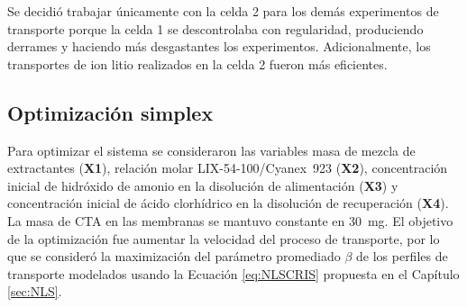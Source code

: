 Se decidió trabajar únicamente con la celda 2 para los demás experimentos de transporte porque la celda 1 se descontrolaba con regularidad, produciendo derrames y haciendo más desgastantes los experimentos. Adicionalmente, los transportes de ion litio realizados en la celda 2 fueron más eficientes. 




\subsection{Optimización simplex}
Para optimizar el sistema se consideraron las variables masa de mezcla de extractantes (\textbf{X1}), relación molar LIX-54-100/Cyanex~923 (\textbf{X2}), concentración inicial de hidróxido de amonio en la disolución de alimentación (\textbf{X3}) y concentración inicial de ácido clorhídrico en la disolución de recuperación (\textbf{X4}). La masa de \ac{CTA} en las membranas se mantuvo constante en 30~mg. El objetivo de la optimización fue aumentar la velocidad del proceso de transporte, por lo que se consideró la maximización del parámetro promediado $\beta$ de los perfiles de transporte modelados usando la Ecuación \ref{eq:NLSCRIS} propuesta en el Capítulo \ref{sec:NLS}.

